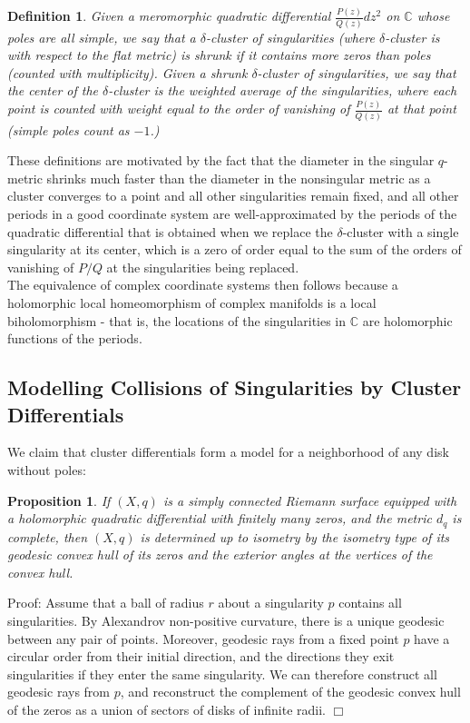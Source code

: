 \documentclass[12pt]{article}
\newtheorem{proposition}[theorem]{Proposition}
\newtheorem{definition}[theorem]{Definition}
\newcommand{\cc}{\mathbb{C}}
\begin{document}
\begin{definition}Given a meromorphic quadratic differential $\frac{P(z)}{Q(z)}dz^2$ on $\cc$ whose poles are all simple, we say that a $\delta$-cluster of singularities (where $\delta$-cluster is with respect to the flat metric) is \emph{shrunk} if it contains more zeros than poles (counted with multiplicity). Given a shrunk $\delta$-cluster of singularities, we say that the \emph{center} of the $\delta$-cluster is the weighted average of the singularities, where each point is counted with weight equal to the order of vanishing of $\frac{P(z)}{Q(z)}$ at that point (simple poles count as $-1$.)\end{definition}

\noindent These definitions are motivated by the fact that the diameter in the singular $q$-metric shrinks much faster than the diameter in the nonsingular metric as a cluster converges to a point and all other singularities remain fixed, and all other periods in a good coordinate system are well-approximated by the periods of the quadratic differential that is obtained when we replace the $\delta$-cluster with a single singularity at its center, which is a zero of order equal to the sum of the orders of vanishing of $P/Q$ at the singularities being replaced.\\

\noindent The equivalence of complex coordinate systems then follows because a holomorphic local homeomorphism of complex manifolds is a local biholomorphism - that is, the locations of the singularities in $\cc$ are holomorphic functions of the periods.

\subsection{Modelling Collisions of Singularities by Cluster Differentials}

\noindent We claim that cluster differentials form a model for a neighborhood of any disk without poles:

\begin{proposition}If $(X,q)$ is a simply connected Riemann surface equipped with a holomorphic quadratic differential with finitely many zeros, and the metric $d_q$ is complete, then $(X,q)$ is determined up to isometry by the isometry type of its geodesic convex hull of its zeros and the exterior angles at the vertices of the convex hull.\end{proposition}

\noindent Proof: Assume that a ball of radius $r$ about a singularity $p$ contains all singularities. By Alexandrov non-positive curvature, there is a unique geodesic between any pair of points. Moreover, geodesic rays from a fixed point $p$ have a circular order from their initial direction, and the directions they exit singularities if they enter the same singularity. We can therefore construct all geodesic rays from $p$, and reconstruct the complement of the geodesic convex hull of the zeros as a union of sectors of disks of infinite radii. $\Box$
\end{document}
